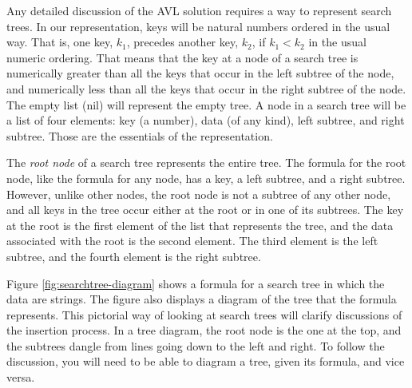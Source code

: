 Any detailed discussion of the AVL solution requires
a way to represent search trees.
In our representation,
\label{key-representation}keys will be natural numbers
ordered in the usual way.
That is, one key, $k_1$, precedes another key, $k_2$,
if $k_1 < k_2$ in the usual numeric ordering.
That means that the key at a node of a search tree
is numerically greater than all the keys that occur in
the left subtree of the node,
and numerically less than
all the keys that occur in the right subtree of the node.
\label{empty-tree-representation}The empty list (\textsf{nil}) will represent the
empty tree.
\label{node-representation}A node
in a search tree will be a list of four elements:
key (a number),
data (of any kind), left subtree, and right subtree.
Those are the essentials of the representation.

\label{root-node-def}
The
\emph{root node}
of a search tree represents the entire tree.
The formula for the root node, like the formula for any node,
has a key, a left subtree, and a right subtree.
However, unlike other nodes, the root node is not a subtree
of any other node, and all keys in the tree occur
either at the root or in one of its subtrees.
The key at the root is the first element of the list that represents the tree,
and the data associated with the root is the second element.
 \label{left-subtree-def}The third element
is the left subtree,
\label{right-subtree-def}and the fourth element is the right subtree.

Figure \ref{fig:searchtree-diagram} shows a formula
for a search tree in which the data are strings.
The figure also displays a diagram of the tree
that the formula represents.
This pictorial way of looking at search trees
will clarify discussions of the insertion process.
In a tree diagram, the root node is the one at the top,
and the subtrees dangle from lines going down to
the left and right.
To follow the discussion,
you will need to be able to diagram a tree,
given its formula, and vice versa.

